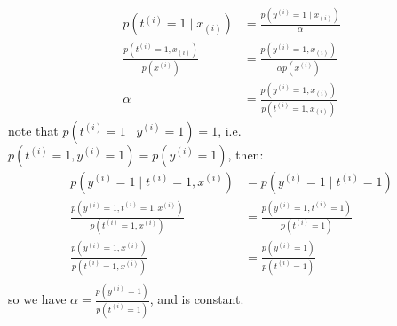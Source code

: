 \begin{answer}
    $$
    \begin{aligned}
        p(t^{(i)}=1 \mid x_{(i)}) &= \frac{p(y^{(i)}=1 \mid x_{(i)})}{\alpha}\\
        \frac{p(t^{(i)}=1 , x_{(i)})}{p(x^{(i)})} &= \frac{p(y^{(i)}=1 , x_{(i)})}{\alpha p(x^{(i)})} \\
        \alpha &= \frac{p(y^{(i)}=1 , x_{(i)})}{p(t^{(i)}=1 , x_{(i)})}
    \end{aligned}
    $$
    note that $p(t^{(i)}=1\mid y^{(i)}=1) = 1$, i.e. $p(t^{(i)}=1, y^{(i)}=1)=p(y^{(i)}=1)$, then:\\
    $$
    \begin{aligned}
        p(y^{(i)} = 1\mid t^{(i)} = 1, x^{(i)}) &= p(y^{(i)} = 1\mid t^{(i)} = 1) \\
        \frac{p(y^{(i)} = 1, t^{(i)} = 1, x^{(i)})}{p(t^{(i)} = 1, x^{(i)}) } &= \frac{p(y^{(i)} = 1, t^{(i)} = 1)}{p(t^{(i)} = 1)}\\
        \frac{p(y^{(i)} = 1, x^{(i)})}{p(t^{(i)} = 1, x^{(i)}) } &= \frac{p(y^{(i)} = 1)}{p(t^{(i)} = 1)}\\
    \end{aligned}
    $$
    so we have $\alpha = \frac{p(y^{(i)} = 1)}{p(t^{(i)} = 1)}$, and is constant. 
\end{answer}
